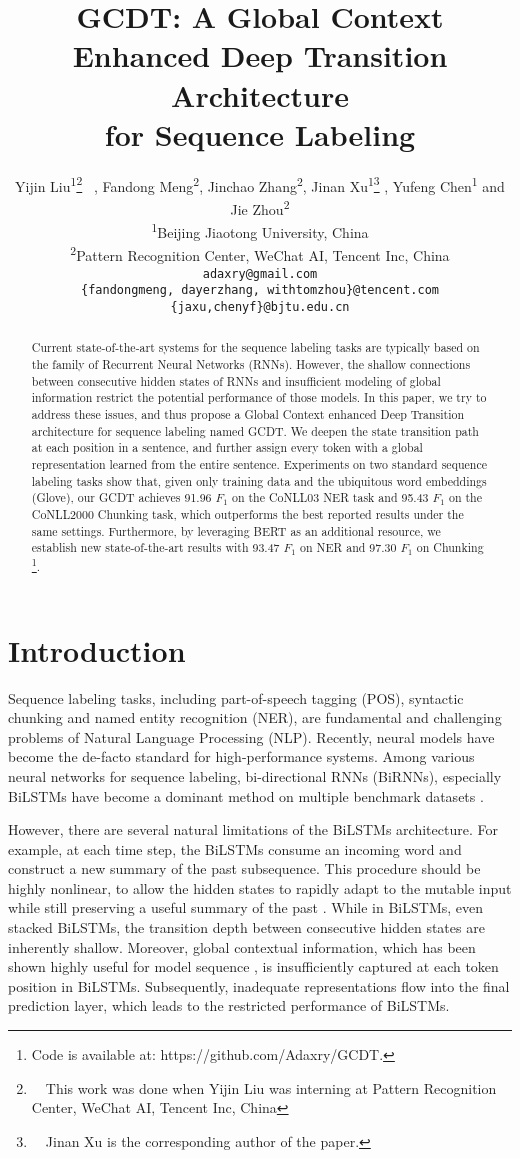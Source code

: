 \documentclass[11pt,a4paper]{article}
\title{GCDT: A Global Context Enhanced Deep Transition Architecture \\ for Sequence Labeling}
\author{
  Yijin Liu\textsuperscript{1}\thanks{\ \ This work was done when Yijin Liu was interning at Pattern Recognition Center, WeChat AI, Tencent Inc, China} \ ,
  Fandong Meng\textsuperscript{2}, 
  Jinchao Zhang\textsuperscript{2}, 
  Jinan Xu\textsuperscript{1}\thanks{ \ \ Jinan Xu is the corresponding author of the paper.} ,
  Yufeng Chen\textsuperscript{1} 
  and Jie Zhou\textsuperscript{2} \\
  \textsuperscript{1}Beijing Jiaotong University, China \\
  \textsuperscript{2}Pattern Recognition Center, WeChat AI, Tencent Inc, China \\
  \texttt{adaxry@gmail.com} \\
  \texttt{\{fandongmeng, dayerzhang, withtomzhou\}@tencent.com} \\
  \texttt{\{jaxu,chenyf\}@bjtu.edu.cn} \\
}
\date{}
\begin{document}
\maketitle
\begin{abstract}
Current state-of-the-art systems for the sequence labeling  tasks are typically based on the family of Recurrent Neural Networks (RNNs). 
However, the shallow connections between consecutive hidden states of RNNs and insufficient modeling of global information restrict the potential performance of those models. In this paper, we try to address these issues, and thus propose a Global Context enhanced Deep Transition architecture for sequence labeling named GCDT.
We deepen the state transition path at each position in a sentence, and further assign every token with a global representation learned from the entire sentence.
Experiments on two standard sequence labeling tasks show that, given only training data and the ubiquitous word embeddings (Glove), our GCDT achieves 91.96 $F_1$ on the CoNLL03 NER task and 95.43 $F_1$ on the CoNLL2000 Chunking task, which outperforms the best reported results under the same settings.
Furthermore, by leveraging BERT as an additional resource, we establish new state-of-the-art results with 93.47 $F_1$ on NER and 97.30 $F_1$ on Chunking \footnote{Code is available at:  https://github.com/Adaxry/GCDT.}. 

\end{abstract}

\section{Introduction}
Sequence labeling tasks, including part-of-speech tagging (POS), syntactic chunking and named entity recognition (NER), are fundamental and challenging problems of Natural Language Processing (NLP).
Recently, neural models have become the de-facto standard for high-performance systems. Among various neural networks for sequence labeling, bi-directional RNNs (BiRNNs), especially BiLSTMs \cite{LSTM} have become a dominant method on multiple benchmark datasets \cite{BLSTM+CRF,char-CNN+BLSTM,char-LSTM+BLSTM+CRF,Peter2017}.

However, there are several natural limitations of the BiLSTMs architecture. For example, at each time step, the BiLSTMs consume an incoming word and construct a new summary of the past subsequence. This procedure should be highly nonlinear, to allow the hidden states to rapidly adapt to the mutable input while still preserving a useful summary of the past \cite{DT_language_model}. While in BiLSTMs, even stacked BiLSTMs, the transition depth between consecutive hidden states are inherently shallow. Moreover, global contextual information, which has been shown highly useful for model sequence \cite{SLSTM}, is insufficiently captured at each token position in BiLSTMs. Subsequently, inadequate representations flow into the final prediction layer, which leads to the restricted performance of BiLSTMs.
\end{document}
